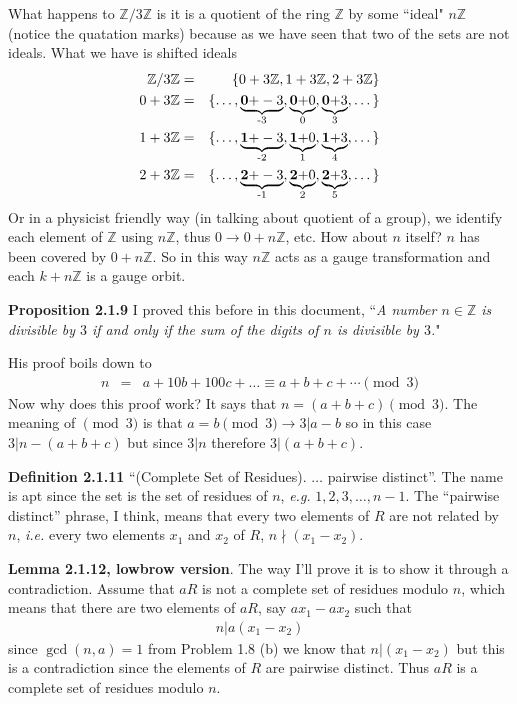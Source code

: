 \documentclass[aps,preprint,preprintnumbers,nofootinbib,showpacs,prd]{revtex4-1}
\newcommand{\ie}{{\it i.e.} }
\newcommand{\eg}{{\it e.g.} }
\newcommand{\nbea}{\begin{eqnarray*}}
\newcommand{\neea}{\end{eqnarray*}}
\begin{document}
What happens to $\mathbb{Z}/3\mathbb{Z}$ is it is a quotient of the ring $\mathbb{Z}$ by some ``ideal" $n\mathbb{Z}$ (notice the quatation marks) because as we have seen that two of the sets are not ideals. What we have is shifted ideals
%
\nbea
\mathbb{Z}/3\mathbb{Z} & = & \{ 0 + 3\mathbb{Z}, 1 + 3\mathbb{Z}, 2 + 3\mathbb{Z}\} \\
0 + 3\mathbb{Z} & = & \{\dots, \underbrace{{\bf 0+}-3}_\text{-3},\underbrace{{\bf 0+}0}_\text{0}, \underbrace{{\bf 0+}3}_\text{3}, \dots\} \\
1 + 3\mathbb{Z} & = & \{\dots, \underbrace{{\bf 1+}-3}_\text{-2},\underbrace{{\bf 1+}0}_\text{1},\underbrace{{\bf 1+}3}_\text{4}, \dots\} \\
2 + 3\mathbb{Z} & = & \{\dots, \underbrace{{\bf 2+}-3}_\text{-1},\underbrace{{\bf 2+}0}_\text{2},\underbrace{{\bf 2+}3}_\text{5}, \dots\}
\neea
%
Or in a physicist friendly way (in talking about quotient of a group), we identify each element of $\mathbb{Z}$ using $n\mathbb{Z}$, thus $0 \to 0 + n\mathbb{Z}$, etc. How about $n$ itself? $n$ has been covered by $0 + n\mathbb{Z}$. So in this way $n\mathbb{Z}$ acts as a gauge transformation and each $k + n\mathbb{Z}$ is a gauge orbit.

{\bf Proposition 2.1.9} I proved this before in this document, ``{\it A number $n \in \mathbb{Z}$ is divisible by $3$ if and only if the sum of the digits of $n$ is divisible by $3$.}"

His proof boils down to
%
\nbea
n & = & a + 10b + 100c + \dots \equiv a +b+ c + \cdots \pmod{3}
\neea
%
Now why does this proof work? It says that $n = (a+b+c)\pmod{3}$. The meaning of $\pmod{3}$ is that $a = b\pmod{3} \to 3 | a-b$ so in this case $3 | n - (a+b+c)$ but since $3|n$ therefore $3|(a+b+c).$

{\bf Definition 2.1.11} ``(Complete Set of Residues). $\dots$ pairwise distinct''. The name is apt since the set is the set of residues of $n$, \eg $1,2,3,\dots,n-1$. The ``pairwise distinct'' phrase, I think, means that every two elements of $R$ are not related by $n$, \ie every two elements $x_1$ and $x_2$ of $R$, $n \nmid (x_1 - x_2)$.

{\bf Lemma 2.1.12, lowbrow version}. The way I'll prove it is to show it through a contradiction. Assume that $aR$ is not a complete set of residues modulo $n$, which means that there are two elements of $aR$, say $ax_1 - ax_2$ such that
%
\nbea
n | a(x_1 - x_2)
\neea
%
since $\gcd(n,a) = 1$ from Problem 1.8 (b) we know that $n|(x_1 - x_2)$ but this is a contradiction since the elements of $R$ are pairwise distinct. Thus $aR$ is a complete set of residues modulo $n$.
\end{document}
